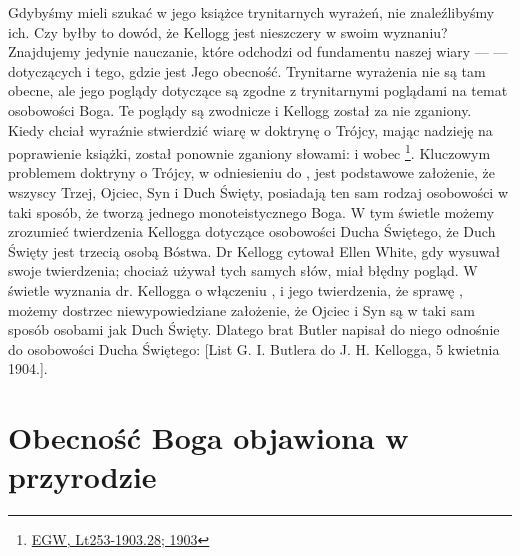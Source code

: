 Gdybyśmy mieli szukać w jego książce trynitarnych wyrażeń, nie znaleźlibyśmy ich. Czy byłby to dowód, że Kellogg jest nieszczery w swoim wyznaniu? Znajdujemy jedynie nauczanie, które odchodzi od fundamentu naszej wiary —  — dotyczących  i tego, gdzie jest Jego obecność. Trynitarne wyrażenia nie są tam obecne, ale jego poglądy dotyczące  są zgodne z trynitarnymi poglądami na temat osobowości Boga. Te poglądy są zwodnicze i Kellogg został za nie zganiony. Kiedy chciał wyraźnie stwierdzić wiarę w doktrynę o Trójcy, mając nadzieję na poprawienie książki, został ponownie zganiony słowami:  i wobec \footnote{\href{https://egwwritings.org/?ref=en_Lt253-1903.28&para=9980.36}{EGW, Lt253-1903.28; 1903}}. Kluczowym problemem doktryny o Trójcy, w odniesieniu do , jest podstawowe założenie, że wszyscy Trzej, Ojciec, Syn i Duch Święty, posiadają ten sam rodzaj osobowości w taki sposób, że tworzą jednego monoteistycznego Boga. W tym świetle możemy zrozumieć twierdzenia Kellogga dotyczące osobowości Ducha Świętego, że Duch Święty jest trzecią osobą Bóstwa. Dr Kellogg cytował Ellen White, gdy wysuwał swoje twierdzenia; chociaż używał tych samych słów, miał błędny pogląd. W świetle wyznania dr. Kellogga o włączeniu , i jego twierdzenia, że sprawę , możemy dostrzec niewypowiedziane założenie, że Ojciec i Syn są w taki sam sposób osobami jak Duch Święty. Dlatego brat Butler napisał do niego odnośnie do osobowości Ducha Świętego: [List G. I. Butlera do J. H. Kellogga, 5 kwietnia 1904.].

\section*{Obecność Boga objawiona w przyrodzie}

